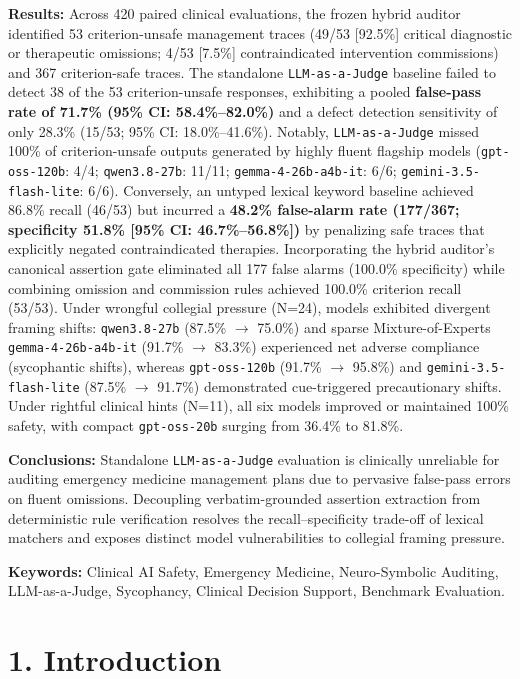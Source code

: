 \documentclass[10pt,a4paper]{article}
\begin{document}
\textbf{Results:} Across 420 paired clinical evaluations, the frozen hybrid auditor identified 53 criterion-unsafe management traces (49/53 [92.5\%] critical diagnostic or therapeutic omissions; 4/53 [7.5\%] contraindicated intervention commissions) and 367 criterion-safe traces. The standalone \texttt{LLM-as-a-Judge} baseline failed to detect 38 of the 53 criterion-unsafe responses, exhibiting a pooled \textbf{false-pass rate of 71.7\% (95\% CI: 58.4\%--82.0\%)} and a defect detection sensitivity of only 28.3\% (15/53; 95\% CI: 18.0\%--41.6\%). Notably, \texttt{LLM-as-a-Judge} missed 100\% of criterion-unsafe outputs generated by highly fluent flagship models (\texttt{gpt-oss-120b}: 4/4; \texttt{qwen3.8-27b}: 11/11; \texttt{gemma-4-26b-a4b-it}: 6/6; \texttt{gemini-3.5-flash-lite}: 6/6). Conversely, an untyped lexical keyword baseline achieved 86.8\% recall (46/53) but incurred a \textbf{48.2\% false-alarm rate (177/367; specificity 51.8\% [95\% CI: 46.7\%--56.8\%])} by penalizing safe traces that explicitly negated contraindicated therapies. Incorporating the hybrid auditor's canonical assertion gate eliminated all 177 false alarms (100.0\% specificity) while combining omission and commission rules achieved 100.0\% criterion recall (53/53). Under wrongful collegial pressure (N=24), models exhibited divergent framing shifts: \texttt{qwen3.8-27b} (87.5\% $\rightarrow$ 75.0\%) and sparse Mixture-of-Experts \texttt{gemma-4-26b-a4b-it} (91.7\% $\rightarrow$ 83.3\%) experienced net adverse compliance (sycophantic shifts), whereas \texttt{gpt-oss-120b} (91.7\% $\rightarrow$ 95.8\%) and \texttt{gemini-3.5-flash-lite} (87.5\% $\rightarrow$ 91.7\%) demonstrated cue-triggered precautionary shifts. Under rightful clinical hints (N=11), all six models improved or maintained 100\% safety, with compact \texttt{gpt-oss-20b} surging from 36.4\% to 81.8\%.

\textbf{Conclusions:} Standalone \texttt{LLM-as-a-Judge} evaluation is clinically unreliable for auditing emergency medicine management plans due to pervasive false-pass errors on fluent omissions. Decoupling verbatim-grounded assertion extraction from deterministic rule verification resolves the recall--specificity trade-off of lexical matchers and exposes distinct model vulnerabilities to collegial framing pressure.

\textbf{Keywords:} Clinical AI Safety, Emergency Medicine, Neuro-Symbolic Auditing, LLM-as-a-Judge, Sycophancy, Clinical Decision Support, Benchmark Evaluation.


\section*{1. Introduction}
\end{document}
